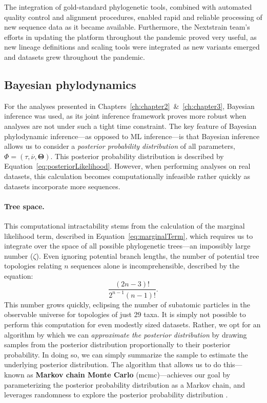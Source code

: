 The integration of gold-standard phylogenetic tools, combined with automated quality control and alignment procedures, enabled rapid and reliable processing of new sequence data as it became available.
Furthermore, the Nextstrain team's efforts in updating the platform throughout the pandemic proved very useful, as new lineage definitions and scaling tools were integrated as new variants emerged and datasets grew throughout the pandemic.

\subsection{Bayesian phylodynamics}
For the analyses presented in Chapters~\ref{ch:chapter2}~\&~\ref{ch:chapter3}, Bayesian inference was used, as its joint inference framework proves more robust when analyses are not under such a tight time constraint.
The key feature of Bayesian phylodynamic inference---as opposed to ML inference---is that Bayesian inference allows us to consider a \textit{posterior probability distribution} of all parameters, $\Phi = (\tau,\overline{\nu},\mathbf{\Theta})$.
This posterior probability distribution is described by Equation~\ref{eq:posteriorLikelihood}.
However, when performing analyses on real datasets, this calculation becomes computationally infeasible rather quickly as datasets incorporate more sequences.

\paragraph*{Tree space.}
This computational intractability stems from the calculation of the marginal likelihood term, described in Equation~\ref{eq:marginalTerm}, which requires us to integrate over the space of all possible phylogenetic trees---an impossibly large number ($\zeta$).
Even ignoring potential branch lengths, the number of potential tree topologies relating $n$ sequences alone is incomprehensible, described by the equation:
\begin{equation}
  \label{eq:treeSpace}
  \frac{(2n-3)!}{2^{n-1}(n-1)!}.
\end{equation}
This number grows quickly, eclipsing the number of subatomic particles in the observable universe \citep{padilla2022fantastic} for topologies of just 29 taxa.
It is simply not possible to perform this computation for even modestly sized datasets.
Rather, we opt for an algorithm by which we can \textit{approximate the posterior distribution} by drawing samples from the posterior distribution proportionally to their posterior probability.
In doing so, we can simply summarize the sample to estimate the underlying posterior distribution.
The algorithm that allows us to do this---known as \textbf{Markov chain Monte Carlo} (\gls{mcmc})---achieves our goal by parameterizing the posterior probability distribution as a Markov chain, and leverages randomness to explore the posterior probability distribution \citep{geyer1992practical}.

